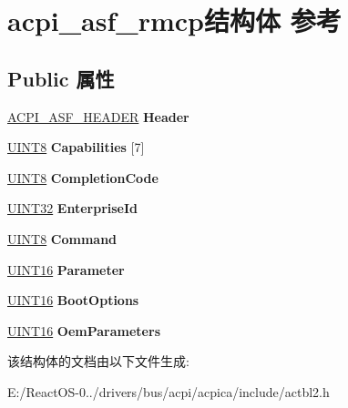 \hypertarget{structacpi__asf__rmcp}{}\section{acpi\+\_\+asf\+\_\+rmcp结构体 参考}
\label{structacpi__asf__rmcp}
\subsection*{Public 属性}
\begin{DoxyCompactItemize}
\item 
\mbox{\label{structacpi__asf__rmcp_ab136d79e7402aab57791a8f14a622717}} 
\hyperlink{structacpi__asf__header}{A\+C\+P\+I\+\_\+\+A\+S\+F\+\_\+\+H\+E\+A\+D\+ER} {\bfseries Header}
\item 
\mbox{\label{structacpi__asf__rmcp_a9b0a536aa915112e09b2dd9dd9b8dfb6}} 
\hyperlink{_processor_bind_8h_ab27e9918b538ce9d8ca692479b375b6a}{U\+I\+N\+T8} {\bfseries Capabilities} \mbox{[}7\mbox{]}
\item 
\mbox{\label{structacpi__asf__rmcp_a6129cbb1ac6ec0e76724e03b55f40b04}} 
\hyperlink{_processor_bind_8h_ab27e9918b538ce9d8ca692479b375b6a}{U\+I\+N\+T8} {\bfseries Completion\+Code}
\item 
\mbox{\label{structacpi__asf__rmcp_addb8ce2dd06c4e98ca32a751d50dff54}} 
\hyperlink{_processor_bind_8h_ae1e6edbbc26d6fbc71a90190d0266018}{U\+I\+N\+T32} {\bfseries Enterprise\+Id}
\item 
\mbox{\label{structacpi__asf__rmcp_a6ced854797f2d12f29bc0e98014a0342}} 
\hyperlink{_processor_bind_8h_ab27e9918b538ce9d8ca692479b375b6a}{U\+I\+N\+T8} {\bfseries Command}
\item 
\mbox{\label{structacpi__asf__rmcp_abbc531d51e8dfcf320f65ebbea429c13}} 
\hyperlink{_processor_bind_8h_a09f1a1fb2293e33483cc8d44aefb1eb1}{U\+I\+N\+T16} {\bfseries Parameter}
\item 
\mbox{\label{structacpi__asf__rmcp_a421aad3b19390921867e39548fc90dd7}} 
\hyperlink{_processor_bind_8h_a09f1a1fb2293e33483cc8d44aefb1eb1}{U\+I\+N\+T16} {\bfseries Boot\+Options}
\item 
\mbox{\label{structacpi__asf__rmcp_a198ec075a0ce1f2e9684a91ddedbe341}} 
\hyperlink{_processor_bind_8h_a09f1a1fb2293e33483cc8d44aefb1eb1}{U\+I\+N\+T16} {\bfseries Oem\+Parameters}
\end{DoxyCompactItemize}


该结构体的文档由以下文件生成\+:\begin{DoxyCompactItemize}
\item 
E\+:/\+React\+O\+S-\/0../drivers/bus/acpi/acpica/include/actbl2.\+h\end{DoxyCompactItemize}
